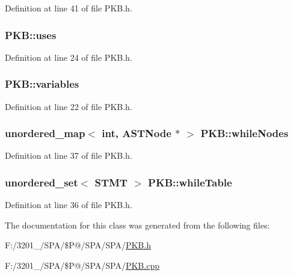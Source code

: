 Definition at line 41 of file P\-K\-B.\-h.

\hypertarget{class_p_k_b_aec685879d658ff43471889ddbee175a9}{
\subsubsection[{uses}]{ P\-K\-B\-::uses\hspace{0.3cm}{\ttfamily [static]}}}\label{class_p_k_b_aec685879d658ff43471889ddbee175a9}


Definition at line 24 of file P\-K\-B.\-h.

\hypertarget{class_p_k_b_a04a10fef1b34afbe28d6e217e7e11d20}{
\subsubsection[{variables}]{ P\-K\-B\-::variables\hspace{0.3cm}{\ttfamily [static]}}}\label{class_p_k_b_a04a10fef1b34afbe28d6e217e7e11d20}


Definition at line 22 of file P\-K\-B.\-h.

\hypertarget{class_p_k_b_a4be6809486f222460f02b45261602dc7}{
\subsubsection[{while\-Nodes}]{\setlength{\rightskip}{0pt plus 5cm}unordered\-\_\-map$<$ int, {\bf A\-S\-T\-Node} $\ast$ $>$ P\-K\-B\-::while\-Nodes\hspace{0.3cm}{\ttfamily [static]}}}\label{class_p_k_b_a4be6809486f222460f02b45261602dc7}


Definition at line 37 of file P\-K\-B.\-h.

\hypertarget{class_p_k_b_ac2d6057e757e3f104e38866f8b6a16e9}{
\subsubsection[{while\-Table}]{\setlength{\rightskip}{0pt plus 5cm}unordered\-\_\-set$<$ {\bf S\-T\-M\-T} $>$ P\-K\-B\-::while\-Table\hspace{0.3cm}{\ttfamily [static]}}}\label{class_p_k_b_ac2d6057e757e3f104e38866f8b6a16e9}


Definition at line 36 of file P\-K\-B.\-h.



The documentation for this class was generated from the following files\-:\begin{DoxyCompactItemize}
\item 
F\-:/3201\-\_/\-S\-P\-A/\$\-P@/\-S\-P\-A/\-S\-P\-A/\hyperlink{_p_k_b_8h}{P\-K\-B.\-h}\item 
F\-:/3201\-\_/\-S\-P\-A/\$\-P@/\-S\-P\-A/\-S\-P\-A/\hyperlink{_p_k_b_8cpp}{P\-K\-B.\-cpp}\end{DoxyCompactItemize}
